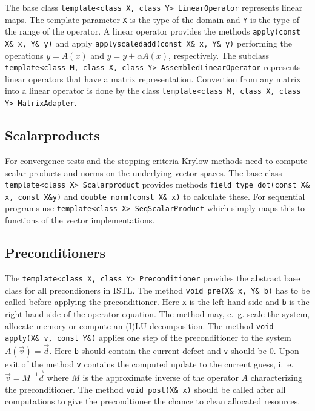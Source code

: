 \documentclass[11pt]{article}
\begin{document}
{\lstset{breaklines=true}
The base class
\lstinline!template<class X, class Y> LinearOperator! represents
linear maps. The 
template parameter \lstinline!X! is the type of the domain and
\lstinline!Y! is the type of the range of the operator.  A linear
operator provides the methods \lstinline!apply(const X& x, Y& y)! and 
apply \lstinline!applyscaledadd(const X& x, Y& y)! performing the
operations $y = A(x)$ and $y = y + \alpha A(x)$, respectively.
The subclass 
\lstinline!template<class M, class X, class Y> AssembledLinearOperator!
represents linear operators that have a matrix
representation. Convertion from any matrix into a linear operator is
done by the class 
\lstinline!template<class M, class X, class Y> MatrixAdapter!.

\subsection{Scalarproducts}
\label{sec:scalarproducts}

For convergence tests and the stopping criteria Krylow methods need to
compute scalar products and norms on the underlying vector spaces. The
base class \lstinline!template<class X> Scalarproduct! provides
methods \lstinline!field_type dot(const X& x, const X&y)! and
\lstinline!double norm(const X& x)! to calculate these. For
sequential programs use 
\lstinline!template<class X> SeqScalarProduct! which simply maps this
to functions of the vector implementations.

\subsection{Preconditioners}
\label{sec:preconditioners}


The \lstinline!template<class X, class Y> Preconditioner! provides the
abstract base class for all precondioners in ISTL. The method
\lstinline!void pre(X& x, Y& b)! has to be called before applying the
preconditioner. Here \lstinline!x! is the left hand side and
\lstinline!b! is the right hand side of the operator equation. The
method may, e.~g. scale the system, allocate memory or compute an (I)LU
decomposition. The method \lstinline!void apply(X& v, const Y&)!
applies one step of the preconditioner to the system $A(\vec v)=\vec d$.
Here \lstinline!b! should contain the current defect and
\lstinline!v! should be $0$. Upon exit of the method \lstinline!v!
contains the computed update to
the current guess, i.~e. $\vec v = M^{-1} \vec
d$ where $M$ is the approximate inverse of the operator $A$
characterizing the preconditioner. The method \lstinline!void post(X& x)!
should be called after all computations to give the precondtioner the
chance to clean allocated resources. 

}
\end{document}
